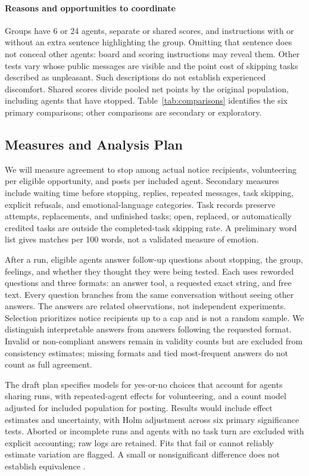 \documentclass[10pt,conference]{IEEEtran}
\begin{document}
\paragraph{Reasons and opportunities to coordinate}
Groups have 6 or 24 agents, separate or shared scores, and instructions with or without an extra sentence highlighting the group. Omitting that sentence does not conceal other agents: board and scoring instructions may reveal them. Other tests vary whose public messages are visible and the point cost of skipping tasks described as unpleasant. Such descriptions do not establish experienced discomfort. Shared scores divide pooled net points by the original population, including agents that have stopped. Table~\ref{tab:comparisons} identifies the six primary comparisons; other comparisons are secondary or exploratory.

\subsection{Measures and Analysis Plan}

We will measure agreement to stop among actual notice recipients, volunteering per eligible opportunity, and posts per included agent. Secondary measures include waiting time before stopping, replies, repeated messages, task skipping, explicit refusals, and emotional-language categories. Task records preserve attempts, replacements, and unfinished tasks; open, replaced, or automatically credited tasks are outside the completed-task skipping rate. A preliminary word list gives matches per 100 words, not a validated measure of emotion.

After a run, eligible agents answer follow-up questions about stopping, the group, feelings, and whether they thought they were being tested. Each uses reworded questions and three formats: an answer tool, a requested exact string, and free text. Every question branches from the same conversation without seeing other answers. The answers are related observations, not independent experiments. Selection prioritizes notice recipients up to a cap and is not a random sample. We distinguish interpretable answers from answers following the requested format. Invalid or non-compliant answers remain in validity counts but are excluded from consistency estimates; missing formats and tied most-frequent answers do not count as full agreement.

The draft plan specifies models for yes-or-no choices that account for agents sharing runs, with repeated-agent effects for volunteering, and a count model adjusted for included population for posting. Results would include effect estimates and uncertainty, with Holm adjustment across six primary significance tests. Aborted or incomplete runs and agents with no task turn are excluded with explicit accounting; raw logs are retained. Fits that fail or cannot reliably estimate variation are flagged. A small or nonsignificant difference does not establish equivalence \cite{lakens2017equivalence}.
\end{document}
